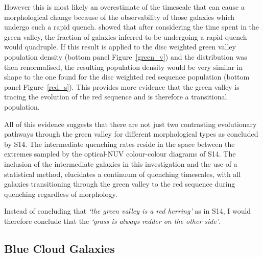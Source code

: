 However this is most likely an overestimate of the timescale that can cause a morphological change because of the observability of those galaxies which undergo such a rapid quench. \citet{Martin07} showed that after considering the time spent in the green valley, the fraction of galaxies inferred to be undergoing a rapid quench would quadruple. If this result is applied to the disc weighted green valley population density (bottom panel Figure~\ref{green_v}) and the distribution was then renormalised, the resulting population density would be very similar in shape to the one found for the disc weighted red sequence population (bottom panel Figure~\ref{red_s}). This provides more evidence that the green valley is tracing the evolution of the red sequence and is therefore a transitional population.

All of this evidence suggests that there are not just two contrasting evolutionary pathways through the green valley for different morphological types as concluded by S14. The intermediate quenching rates reside in the space between the extremes sampled by the optical-NUV colour-colour diagrams of S14. The inclusion of the intermediate galaxies in this investigation and the use of a statistical method, elucidates a continuum of quenching timescales, with all galaxies transitioning through the green valley to the red sequence during quenching regardless of morphology. 

Instead of concluding that \emph{`the green valley is a red herring'} as in S14, I would therefore conclude that the \emph{`grass is always redder on the other side'}.


\subsection{Blue Cloud Galaxies}\label{bc}

